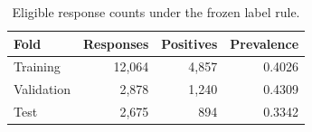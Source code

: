 \begin{table}[t]
\caption{Eligible response counts under the frozen label rule.}
\label{tab:data}\centering
\begin{tabular}{lrrr}\toprule
Fold & Responses & Positives & Prevalence\\\midrule
Training & 12,064 & 4,857 & 0.4026\\
Validation & 2,878 & 1,240 & 0.4309\\
Test & 2,675 & 894 & 0.3342\\\bottomrule
\end{tabular}
\end{table}
